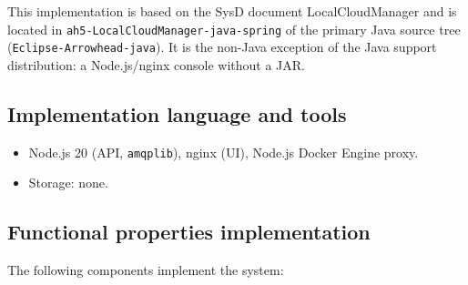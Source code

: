 \documentclass[a4paper]{arrowhead}
\begin{document}
This implementation is based on the SysD document LocalCloudManager \cite{lcm-sysd} and is located in \texttt{ah5-LocalCloudManager-java-spring} of the primary Java source tree (\texttt{Eclipse-Arrowhead-java}). It is the non-Java exception of the Java support distribution: a Node.js/nginx console without a JAR.

\subsection{Implementation language and tools}
\begin{itemize}
\item Node.js 20 (API, \texttt{amqplib}), nginx (UI), Node.js Docker Engine proxy.
\item Storage: none.
\end{itemize}

\subsection{Functional properties implementation}

The following components implement the system:
\end{document}
